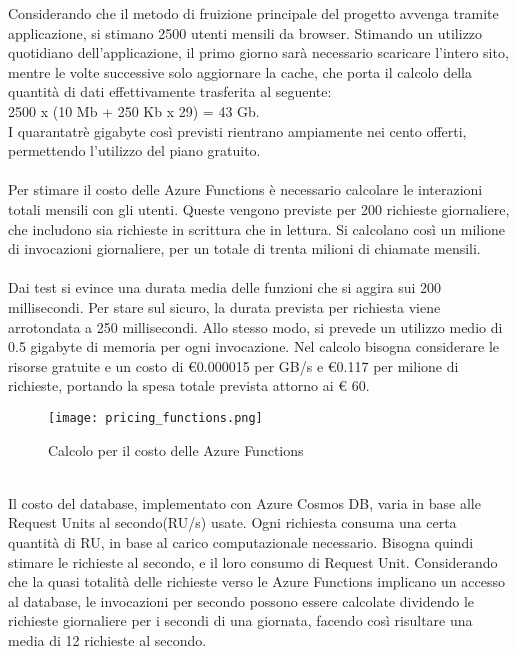 Considerando che il metodo di fruizione principale del progetto avvenga tramite applicazione,
si stimano 2500 utenti mensili da browser.
Stimando un utilizzo quotidiano dell'applicazione, 
il primo giorno sarà necessario scaricare l'intero sito, 
mentre le volte successive solo aggiornare la cache, 
che porta il calcolo della quantità di dati effettivamente trasferita al seguente:\\
2500 x (10 Mb + 250 Kb x 29) = 43 Gb.\\
I quarantatrè gigabyte così previsti rientrano ampiamente nei cento offerti,
permettendo l'utilizzo del piano gratuito.\\
\\
Per stimare il costo delle Azure Functions è necessario calcolare
le interazioni totali mensili con gli utenti.
Queste vengono previste per 200 richieste giornaliere,
che includono sia richieste in scrittura che in lettura.
Si calcolano così un milione di invocazioni giornaliere, 
per un totale di trenta milioni di chiamate mensili.\\
\\
Dai test si evince una durata media delle funzioni che si aggira sui 200 millisecondi.
Per stare sul sicuro, la durata prevista per richiesta 
viene arrotondata a 250 millisecondi.
Allo stesso modo, si prevede un utilizzo medio di 0.5 gigabyte di memoria per ogni invocazione.
Nel calcolo bisogna considerare le risorse gratuite e
un costo di €0.000015 per GB/s e €0.117 per milione di richieste,
portando la spesa totale prevista attorno ai € 60.\\
\begin{figure}[htbp]
    \begin{center}
        \texttt{[image: pricing\_functions.png]}
        \caption{Calcolo per il costo delle Azure Functions}
    \end{center}
\end{figure}
\\
Il costo del database, implementato con Azure Cosmos DB, 
varia in base alle Request Units al secondo(RU/s) usate.
Ogni richiesta consuma una certa quantità di RU, 
in base al carico computazionale necessario.
Bisogna quindi stimare le richieste al secondo,
e il loro consumo di Request Unit.
Considerando che la quasi totalità delle richieste 
verso le Azure Functions implicano un accesso al database,
le invocazioni per secondo possono essere calcolate 
dividendo le richieste giornaliere per i secondi di una giornata,
facendo così risultare una media di 12 richieste al secondo.\\

